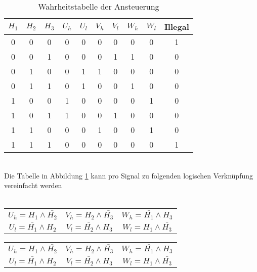         \begin{table}[h!]
            \begin{tabular}{ccc||cc|cc|cc||c}
                 $H_1$ & $H_2$ & $H_3$ & $U_h$ & $U_l$ & $V_h$ & $V_l$ & $W_h$ & $W_l$ & Illegal\\
            \hline 0   &   0   &   0   &   0   &   0   &   0   &   0   &   0   &   0   &   1\\
                   0   &   0   &   1   &   0   &   0   &   0   &   1   &   1   &   0   &   0\\
                   0   &   1   &   0   &   0   &   1   &   1   &   0   &   0   &   0   &   0\\
                   0   &   1   &   1   &   0   &   1   &   0   &   0   &   1   &   0   &   0\\
                   1   &   0   &   0   &   1   &   0   &   0   &   0   &   0   &   1   &   0\\
                   1   &   0   &   1   &   1   &   0   &   0   &   1   &   0   &   0   &   0\\
                   1   &   1   &   0   &   0   &   0   &   1   &   0   &   0   &   1   &   0\\
                   1   &   1   &   1   &   0   &   0   &   0   &   0   &   0   &   0   &   1\\
            \end{tabular}
           	\centering
           	\caption{Wahrheitstabelle der Ansteuerung} 
            \label{abb:WahrheitstabelleAnsteuerung}
        \end{table}\\
        Die Tabelle in Abbildung \ref{abb:WahrheitstabelleAnsteuerung} kann pro Signal zu folgenden 
        logischen Verknüpfung vereinfacht werden\\
        \\
    \ifSTANDALONE
        \begin{table}
            \centering
            \begin{tabular}{ccc}
                $U_h = H_1 \wedge \bar{H_2}$ & $V_h = H_2 \wedge \bar{H_3}$ & $W_h = \bar{H_1} \wedge H_3$\\
                $U_l = \bar{H_1} \wedge H_2$ & $V_l = \bar{H_2} \wedge H_3$ & $W_l = H_1 \wedge \bar{H_3}$
            \end{tabular}
        \end{table}
    \fi
    \ifEMBED
        \begin{tabular}{ccc}
            $U_h = H_1 \wedge \bar{H_2}$ & $V_h = H_2 \wedge \bar{H_3}$ & $W_h = \bar{H_1} \wedge H_3$\\
            $U_l = \bar{H_1} \wedge H_2$ & $V_l = \bar{H_2} \wedge H_3$ & $W_l = H_1 \wedge \bar{H_3}$
        \end{tabular}
    \fi
    \ifSTANDALONE
